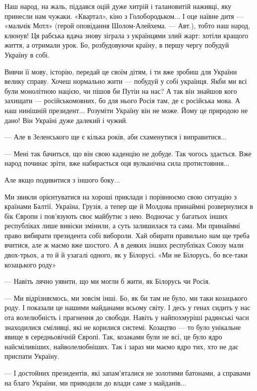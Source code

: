 \begin{longtable}
Наш народ, на жаль, піддався оцій дуже хитрій і талановитій наживці, яку
принесли нам чужаки. «Квартал», кіно з Голобородьком... І оце наївне дитя —
«мальчік Мотл» (герой оповідання Шолом-Алейхема. — Авт.), тобто наш народ,
клюнув! Ця рабська вдача знову зіграла з українцями злий жарт: хотіли кращого
життя, а отримали урок. Бо, розбудовуючи країну, в першу чергу побудуй Україну
в собі.

Вивчи її мову, історію, передай це своїм дітям, і ти вже зробиш для України
велику справу. Хочеш нормально жити — побудуй у собі українця. Якби ми всі були
монолітною нацією, чи пішов би Путін на нас? А так він знайшов кого захищати —
російськомовних, бо для нього Росія там, де є російська мова. А наш нинішній
президент... Розуміти Україну він не може. Йому це природою не дано! Він
Україні дуже далекий і чужий.


— Але в Зеленського ще є кілька років, аби схаменутися і ви­правитися...


— Мені так бачиться, що він свою каденцію не добуде. Так чогось здається. Вже
народ починає зріти, вже набирається оця вулканічна сила протистояння...

Але якщо подивитися з іншого боку...

Ми звикли орієнтуватися на хороші приклади і порівнюємо свою ситуацію з країнами Балтії. Україна, Грузія, а тепер ще й Молдова принаймні розвернулися в бік Європи і пов’язують своє майбутнє з нею. Водночас у багатьох інших республіках лише вивіски змінили, а суть залишилася та сама. Ми принаймні право вибирати президента собі вибороли. Хай обирати правильно нам ще треба вчитися, але ж маємо вже шостого. А в деяких інших республіках Союзу мали двох-трьох, а то й й узагалі одного, як у Білорусі.
«Ми не Білорусь, бо все-таки козацького роду»

— Навіть лячно уявити, що ми могли б жити, як Білорусь чи Росія.

— Ми відрізняємось, ми зов­сім інші. Бо, як би там не було, ми таки козацького
роду. І показали це нашими майданами всьому світу. І десь у генах сидить у нас
ота волелюбність і прагнення до свободи. Навіть у найпо­хмуріші радянські часи
знаходилися сміливці, які не корилися системі. Козацтво — то було унікальне
явище в середньовічній Європі. Так, козаками були не всі, це було ядро
найсміливіших, найволелюбніших. Так і зараз ми маємо ядро тих, хто не дає
приспати Україну.


— І достойних президентів, які запам’яталися не золотими батонами, а справами на благо України, ми приводили до влади саме з майданів...


\end{longtable}
